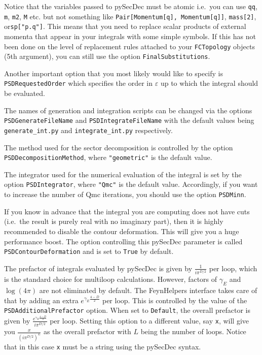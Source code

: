\documentclass[../FeynHelpersManual.tex]{subfiles}
\begin{document}
Notice that the variables passed to pySecDec must be atomic i.e.~you can
use \texttt{qq}, \texttt{m}, \texttt{m2}, \texttt{M} etc. but not
something like
\texttt{Pair[\allowbreak{}Momentum[\allowbreak{}q],\ \allowbreak{}Momentum[\allowbreak{}q]]},
\texttt{mass[\allowbreak{}2]}, or\texttt{sp[\allowbreak{}"p.q"]}. This
means that you need to replace scalar products of external momenta that
appear in your integrals with some simple symbols. If this has not been
done on the level of replacement rules attached to your
\texttt{FCTopology} objects (5th argument), you can still use the option
\texttt{FinalSubstitutions}.

Another important option that you most likely would like to specify is
\texttt{PSDRequestedOrder} which specifies the order in \(\varepsilon\)
up to which the integral should be evaluated.

The names of generation and integration scripts can be changed via the
options \texttt{PSDGenerateFileName} and \texttt{PSDIntegrateFileName}
with the default values being \texttt{generate_int.py} and
\texttt{integrate_int.py} respectively.

The method used for the sector decomposition is controlled by the option
\texttt{PSDDecompositionMethod}, where \texttt{"geometric"} is the
default value.

The integrator used for the numerical evaluation of the integral is set
by the option \texttt{PSDIntegrator}, where \texttt{"Qmc"} is the
default value. Accordingly, if you want to increase the number of Qmc
iterations, you should use the option \texttt{PSDMinn}.

If you know in advance that the integral you are computing does not have
cuts (i.e.~the result is purely real with no imaginary part), then it is
highly recommended to disable the contour deformation. This will give
you a huge performance boost. The option controlling this pySecDec
parameter is called \texttt{PSDContourDeformation} and is set to
\texttt{True} by default.

The prefactor of integrals evaluated by pySecDec is given by
\(\frac{1}{i \pi^{D/2}}\) per loop, which is the standard choice for
multiloop calculations. However, factors of \(\gamma_E\) and
\(\log(4\pi)\) are not eliminated by default. The FeynHelpers interface
takes care of that by adding an extra \(e^{\gamma_E \frac{4-D}{2}}\) per
loop. This is controlled by the value of the
\texttt{PSDAdditionalPrefactor} option. When set to \texttt{Default},
the overall prefactor is given by
\(\frac{e^{\gamma_E \frac{4-D}{2}}}{i \pi^{D/2}}\) per loop. Setting
this option to a different value, say \texttt{x}, will give you
\(\frac{x}{(i \pi^{D/2})^L}\) as the overall prefactor with \(L\) being
the number of loops. Notice that in this case \texttt{x} must be a
string using the pySecDec syntax.
\end{document}
